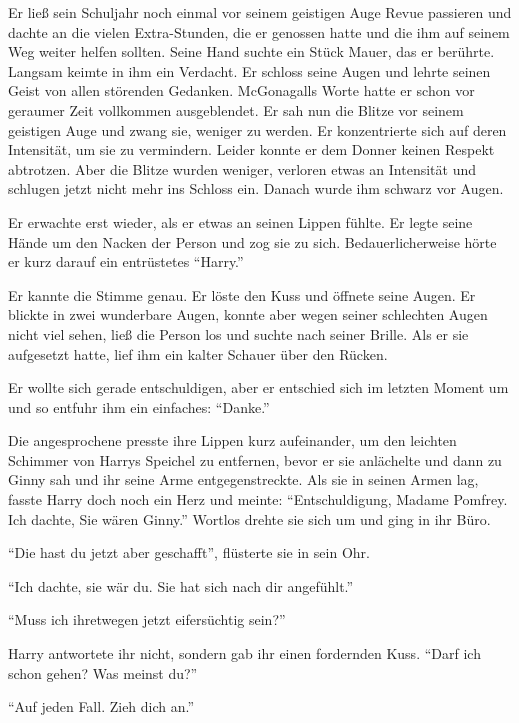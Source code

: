 Er ließ sein Schuljahr noch einmal vor seinem geistigen Auge Revue passieren und dachte an die vielen Extra-Stunden, die er genossen hatte und die ihm auf seinem Weg weiter helfen sollten. Seine Hand suchte ein Stück Mauer, das er berührte. Langsam keimte in ihm ein Verdacht. Er schloss seine Augen und lehrte seinen Geist von allen störenden Gedanken. McGonagalls Worte hatte er schon vor geraumer Zeit vollkommen ausgeblendet. Er sah nun die Blitze vor seinem geistigen Auge und zwang sie, weniger zu werden. Er konzentrierte sich auf deren Intensität, um sie zu vermindern. Leider konnte er dem Donner keinen Respekt abtrotzen. Aber die Blitze wurden weniger, verloren etwas an Intensität und schlugen jetzt nicht mehr ins Schloss ein. Danach wurde ihm schwarz vor Augen.

Er erwachte erst wieder, als er etwas an seinen Lippen fühlte. Er legte seine Hände um den Nacken der Person und zog sie zu sich. Bedauerlicherweise hörte er kurz darauf ein entrüstetes \enquote{Harry.}

Er kannte die Stimme genau.  Er löste den Kuss und öffnete seine Augen. Er blickte in zwei wunderbare Augen, konnte aber wegen seiner schlechten Augen nicht viel sehen, ließ die Person los und suchte nach seiner Brille. Als er sie aufgesetzt hatte, lief ihm ein kalter Schauer über den Rücken.

Er wollte sich gerade entschuldigen, aber er entschied sich im letzten Moment um und so entfuhr ihm ein einfaches: \enquote{Danke.}

Die angesprochene presste ihre Lippen kurz aufeinander, um den leichten Schimmer von Harrys Speichel zu entfernen, bevor er sie anlächelte und dann zu Ginny sah und ihr seine Arme entgegenstreckte. Als sie in seinen Armen lag, fasste Harry doch noch ein Herz und meinte: \enquote{Entschuldigung, Madame Pomfrey. Ich dachte, Sie wären Ginny.} Wortlos drehte sie sich um und ging in ihr Büro.

\enquote{Die hast du jetzt aber geschafft}, flüsterte sie in sein Ohr.

\enquote{Ich dachte, sie wär du. Sie hat sich nach dir angefühlt.}

\enquote{Muss ich ihretwegen jetzt eifersüchtig sein?}

Harry antwortete ihr nicht, sondern gab ihr einen fordernden Kuss. \enquote{Darf ich schon gehen? Was meinst du?}

\enquote{Auf jeden Fall. Zieh dich an.}

